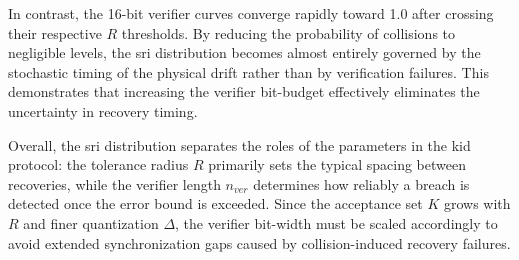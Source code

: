 In contrast, the 16-bit verifier curves converge rapidly toward 1.0 after crossing their respective $R$ thresholds. By reducing the probability of collisions to negligible levels, the \gls{sri} distribution becomes almost entirely governed by the stochastic timing of the physical drift rather than by verification failures. This demonstrates that increasing the verifier bit-budget effectively eliminates the uncertainty in recovery timing.

Overall, the \gls{sri} distribution separates the roles of the parameters in the \gls{kid} protocol: the tolerance radius $R$ primarily sets the typical spacing between recoveries, while the verifier length $n_{ver}$ determines how reliably a breach is detected once the error bound is exceeded. Since the acceptance set $K$ grows with $R$ and finer quantization $\Delta$, the verifier bit-width must be scaled accordingly to avoid extended synchronization gaps caused by collision-induced recovery failures.